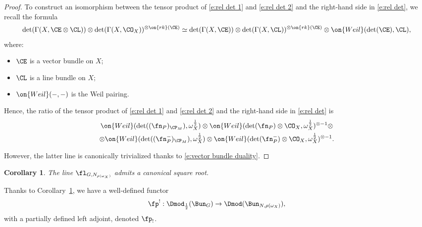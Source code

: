 \documentclass[9pt]{amsart}
\newtheorem{cor}[subsubsection]{Corollary}
\theoremstyle{remark}
\theoremstyle{definition}
\theoremstyle{remark}
\newcommand{\secref}[1]{Sect.~\ref{#1}}
\newcommand{\corref}[1]{Corollary~\ref{#1}}
\numberwithin{equation}{section}
\begin{document}
\begin{proof}
\medskip

To construct an isomorphism between the tensor product of \eqref{e:rel det 1} and \eqref{e:rel det 2} and the
right-hand side in \eqref{e:rel det},
we recall the formula 
\begin{equation} \label{e:det formula}
\det(\Gamma(X,\CE\otimes \CL))\otimes \det(\Gamma(X,\CO_X))^{\otimes \on{rk}(\CE)}
\simeq \det(\Gamma(X,\CE))\otimes \det(\Gamma(X,\CL))^{\otimes \on{rk}(\CE)}\otimes \on{Weil}(\det(\CE),\CL),
\end{equation} 
where:

\begin{itemize}

\item $\CE$ is a vector bundle on $X$;

\item $\CL$ is a line bundle on $X$;

\item $\on{Weil}(-,-)$ is the Weil pairing.

\end{itemize}

\medskip

Hence, the ratio of the tensor product of \eqref{e:rel det 1} and \eqref{e:rel det 2} and the
right-hand side in \eqref{e:rel det} is 
\begin{multline} 
\on{Weil}(\det((\fn_P)_{\CP_M}),\omega_X^{\frac{1}{2}})\otimes 
\on{Weil}(\det(\fn_P)\otimes \CO_X,\omega_X^{\frac{1}{2}})^{\otimes -1}\otimes \\
\otimes \on{Weil}(\det((\fn^-_P)_{\CP_M}),\omega_X^{\frac{1}{2}})\otimes 
\on{Weil}(\det(\fn^-_P)\otimes \CO_X,\omega_X^{\frac{1}{2}})^{\otimes -1}.
\end{multline} 

However, the latter line is canonically trivialized thanks to \eqref{e:vector bundle duality}.

\end{proof} 

\begin{cor} \label{c:det to BunN rho}
The line $\fl_{G,N_{\rho(\omega_X)}}$ admits a canonical %
square root. 
\end{cor}

\sssec{}

Thanks to \corref{c:det to BunN rho}, we have a well-defined functor
$$\fp^!:\Dmod_{\frac{1}{2}}(\Bun_G)\to \Dmod(\Bun_{N,\rho(\omega_X)}),$$
with a partially defined left adjoint, denoted $\fp_!$. 
\end{document}
